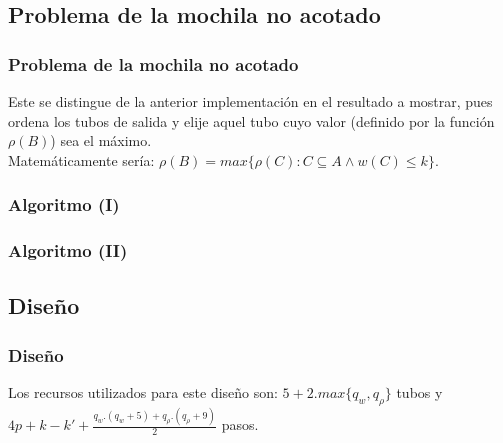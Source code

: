 \documentclass[12pt]{beamer}
\begin{document}
 \begin{frame}
     \section{Problema de la mochila no acotado}
     \frametitle{Problema de la mochila no acotado}
     Este se distingue de la anterior implementación en el resultado a mostrar, pues ordena los tubos de salida y elije aquel tubo cuyo valor (definido por la función $\rho(B)$) sea el máximo. \\
     Matemáticamente sería: $\rho(B)=max\{\rho(C): C\subseteq A \land w(C)\leq k\}$.
 \end{frame}
 \begin{frame}
     \frametitle{Algoritmo (I)}
     \begin{algorithmic}[1]
        \EndFor
        \State{$\cdots$}
        \EndProcedure
    \end{algorithmic}
 \end{frame}
 \begin{frame}
     \frametitle{Algoritmo (II)}
     \begin{algorithmic}[1]
        \State {$\cdots$}
            \Else
            \EndIf
        \EndWhile
        \EndProcedure
    \end{algorithmic}
 \end{frame}
 \begin{frame}
     \subsection{Diseño}
     \frametitle{Diseño}
     Los recursos utilizados para este diseño son: $5+2 . max\{q_w,q_\rho\}$ tubos y $4p+ k-k'+\frac{q_w.(q_w+5)+q_\rho.(q_\rho+9)}{2}$ pasos.
 \end{frame}
\end{document}
